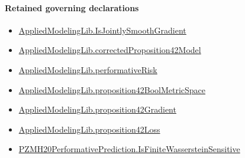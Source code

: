 \documentclass[10pt]{article}
\begin{document}
\paragraph{Retained governing declarations}
\begin{itemize}\raggedright
\item \hyperlink{library-prerequisite-2e05b739f5b71f23}{Applied\allowbreak{}Modeling\allowbreak{}Lib.\allowbreak{}Is\allowbreak{}Jointly\allowbreak{}Smooth\allowbreak{}Gradient}
\item \hyperlink{governing-declaration-a540759b18439129}{Applied\allowbreak{}Modeling\allowbreak{}Lib.\allowbreak{}corrected\allowbreak{}Proposition42\allowbreak{}Model}
\item \hyperlink{governing-declaration-4a2c8294f0669302}{Applied\allowbreak{}Modeling\allowbreak{}Lib.\allowbreak{}performative\allowbreak{}Risk}
\item \hyperlink{governing-declaration-d4d35ede9cba1f94}{Applied\allowbreak{}Modeling\allowbreak{}Lib.\allowbreak{}proposition42\allowbreak{}Bool\allowbreak{}Metric\allowbreak{}Space}
\item \hyperlink{governing-declaration-8c485a232d3e9b18}{Applied\allowbreak{}Modeling\allowbreak{}Lib.\allowbreak{}proposition42\allowbreak{}Gradient}
\item \hyperlink{governing-declaration-ded6eb207c916fe6}{Applied\allowbreak{}Modeling\allowbreak{}Lib.\allowbreak{}proposition42\allowbreak{}Loss}
\item \hyperlink{governing-declaration-12799a7660a5d8a2}{PZMH20\allowbreak{}Performative\allowbreak{}Prediction.\allowbreak{}Is\allowbreak{}Finite\allowbreak{}Wasserstein\allowbreak{}Sensitive}
\end{itemize}
\end{document}
